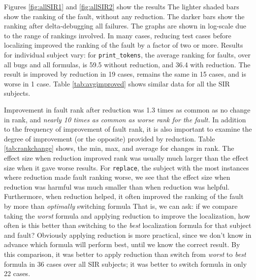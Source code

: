 Figures \ref{fig:allSIR1} and \ref{fig:allSIR2} show the
results
The
lighter shaded bars show the ranking of the fault, without any
reduction.  The darker bars show the ranking after delta-debugging all
failures.  The graphs are shown in log-scale due to the range of
rankings involved.  In many cases, reducing test cases before
localizing improved the ranking of the fault by a factor of two or
more.  Results for individual subject vary: for {\tt print\_tokens},
the average ranking for faults, over all bugs and all formulas, is
59.5 without reduction, and 36.4 with reduction.  The result is
improved by reduction in 19 cases, remains the same in 15 cases, and
is worse in 1 case.  
Table \ref{tab:avgimproved} shows similar data for all the SIR
subjects.  

Improvement in fault rank after reduction was 1.3 times as common as no change
in rank, and \emph{nearly 10 times as common as worse rank for the
fault.}  In addition to the frequency of improvement of fault rank, it
is also important to examine the degree of improvement (or the
opposite) provided by reduction.  Table \ref{tab:rankchange} shows,
the min, max, and average for changes in rank.  The effect
size when reduction improved rank was usually much larger than the
effect size when it gave worse results.  For {\tt replace}, the
subject with the most instances where reduction made fault ranking
worse, we see that the effect size when reduction was harmful was much
smaller than when reduction was helpful.  Furthermore, when reduction
helped, it often improved the ranking of the fault by more than
\emph{optimally} switching formula  That is, we can ask: if we compare
taking the \emph{worst} formula and applying reduction to improve the
localization, how often is this better than switching to the
\emph{best} localization formula for that subject and fault?
Obviously applying reduction is more practical, since we don't know in
advance which formula will perform best, until we know the correct
result.  By this comparison, it was better to
apply reduction than switch from \emph{worst} to \emph{best} formula
in 36 cases over all SIR subjects;  it was better to switch formula in
only 22 cases.



